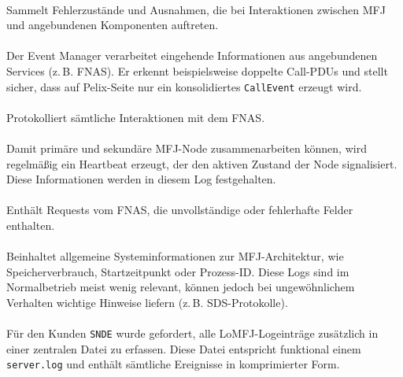 \paragraph{\lomfjErrorLog}
Sammelt Fehlerzustände und Ausnahmen, die bei Interaktionen zwischen MFJ und angebundenen Komponenten auftreten.

\paragraph{\lomfjEventmanagerLog}
Der Event Manager verarbeitet eingehende Informationen aus angebundenen Services (z.\,B. FNAS).  
Er erkennt beispielsweise doppelte Call-PDUs und stellt sicher, dass auf Pelix-Seite nur ein konsolidiertes \texttt{CallEvent} erzeugt wird.

\paragraph{\lomfjFnasLog}
Protokolliert sämtliche Interaktionen mit dem FNAS.

\paragraph{\lomfjHeartbeatLog}
Damit primäre und sekundäre MFJ-Node zusammenarbeiten können, wird regelmäßig ein Heartbeat erzeugt, der den aktiven Zustand der Node signalisiert. Diese Informationen werden in diesem Log festgehalten.

\paragraph{\lomfjIncompleteFnasPdusLog}
Enthält Requests vom FNAS, die unvollständige oder fehlerhafte Felder enthalten.

\paragraph{\lomfjMfjLog}
Beinhaltet allgemeine Systeminformationen zur MFJ-Architektur, wie Speicherverbrauch, Startzeitpunkt oder Prozess-ID.  
Diese Logs sind im Normalbetrieb meist wenig relevant, können jedoch bei ungewöhnlichem Verhalten wichtige Hinweise liefern (z.\,B. SDS-Protokolle).

\paragraph{\lomfjMfjServerLog}
Für den Kunden \texttt{SNDE} wurde gefordert, alle LoMFJ-Logeinträge zusätzlich in einer zentralen Datei zu erfassen.  
Diese Datei entspricht funktional einem \texttt{server.log} und enthält sämtliche Ereignisse in komprimierter Form.

